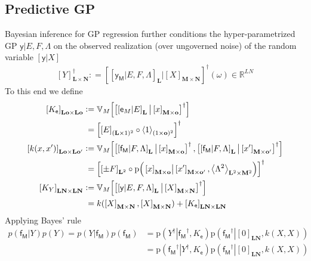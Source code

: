 \documentclass[preprint,12pt]{elsarticle}
\newcommand*{\M}[1]{\ensuremath{#1}\xspace}
\newcommand*{\x}{\times}
\newcommand*{\mi}[1]{\mathbf{#1}}
\newcommand*{\st}[1]{\mathbb{#1}}
\newcommand*{\rv}[1]{\mathsf{#1}}
\newcommand*{\te}[2][]{\left\lbrack{#2}\right\rbrack_{#1}}
\newcommand*{\diag}[2][]{\left\langle{#2}\right\rangle_{#1}}
\newcommand*{\prob}[3]{\M{\mathrm{p}\!\left(\left.{#1}\right\vert{#2,#3}\right)}}
\newcommand*{\deq}{\M{\mathrel{\mathop:}=}}
\newcommand*{\cov}[3][]{\ifthenelse{\equal{#1}{}}{\mathbb{V}_{#3}\!\left\lbrack{#2}\right\rbrack}{\mathbb{V}_{#3}\!\left\lbrack{#2,#1}\right\rbrack}}
\begin{document}
    \subsection{Predictive GP} \label{sub:GPR:Predictive}
        Bayesian inference for GP regression further conditions the hyper-parametrized GP $\rv{y} \vert E,F,\Lambda$ on the observed realization (over ungoverned noise) of the random variable $\te{\rv{y}\vert X}$
        \begin{equation*}
            \te[\mi{L} \x \mi{N}]{Y}^{\dagger} \deq \te{\te[\mi{L}]{\rv{y_M}\vert E,F,\Lambda} \big\vert \te[\mi{M}\x\mi{N}]{X}}^{\dagger}\!(\omega) \in \st{R}^{LN}
        \end{equation*}
        To this end we define
        \begin{equation} \label{def:GPR:Kk}
            \begin{aligned}
                \te[\mi{Lo}\x\mi{Lo}]{K_{\rv{e}}} &\deq 
                \cov{\te{\te[\mi{L}]{\rv{e}_{M}\vert E} \big\vert \te[\mi{M}\x\mi{o}]{x}}^{\dagger}}{M} \\
                &\phantom{:}= \te{\te[(\mi{L}\x 1)^2]{E} \circ \diag[(1\x\mi{o})^2]{1}}^{\dagger} \\
                \te[\mi{Lo}\x\mi{L o^{\prime}}]{k(x, x^{\prime})} &\deq
                \cov[{\te{\te[\mi{L}]{\rv{f_M}\vert F,\Lambda} \big\vert \te[\mi{M}\x\mi{o^{\prime}}]{x^{\prime}}}^{\dagger}}]
                {\te{\te[\mi{L}]{\rv{f_M}\vert F,\Lambda} \big\vert \te[\mi{M}\x\mi{o}]{x}}^{\dagger}}{M} \\
                &\phantom{:}= \te{\te[\mi{L}^{2}]{\pm F} \circ 
                \prob{\te[\mi{M}\x\mi{o}]{x}}{\te[\mi{M}\x\mi{o^{\prime}}]{x^{\prime}}}
                {\diag[\mi{L}^{2}\x\mi{M}^{2}]{\Lambda^{2}}}}^{\dagger} \\
                \te[\mi{LN}\x\mi{LN}]{K_{Y}} &\deq 
                \cov{\te{\te[\mi{L}]{\rv{y}\vert E,F,\Lambda} \big\vert \te[\mi{M}\x\mi{N}]{X}}^{\dagger}}{M} \\
                &\phantom{:}= k(\te[\mi{M}\x\mi{N}]{X},\te[\mi{M}\x\mi{N}]{X}) + \te[\mi{LN}\x\mi{LN}]{K_{\rv{e}}}
            \end{aligned}
        \end{equation}
        Applying Bayes' rule
        \begin{equation*}
            \begin{aligned}
                p(\rv{f_M}\vert Y)p(Y) = p(Y\vert \rv{f_M})p(\rv{f_M})
                &= \prob{Y^{\dagger}}{\rv{f_M}^{\dagger}}{K_{\rv{e}}} \prob{\rv{f_M}^{\dagger}}{\te[\mi{LN}]{0}}{k(X,X)} \\
                &= \prob{\rv{f_M}^{\dagger}}{Y^{\dagger}}{K_{\rv{e}}} \prob{\rv{f_M}^{\dagger}}{\te[\mi{LN}]{0}}{k(X,X)}
            \end{aligned}
        \end{equation*}
\end{document}
